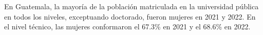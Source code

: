 En Guatemala, la mayoría de la población matriculada en la universidad pública en todos los niveles, exceptuando doctorado, fueron mujeres en 2021 y 2022. En el nivel técnico, las mujeres conformaron el 67.3\% en 2021 y el 68.6\% en 2022. 
